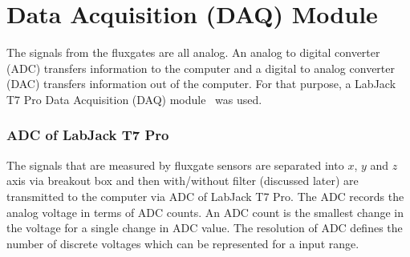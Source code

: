 \section{Data Acquisition (DAQ) Module}\label{sec:DAQ}

The signals from the fluxgates are all analog. An analog to digital converter (ADC) transfers information to the computer and a digital to analog converter (DAC) transfers information out of the computer. For that purpose, a LabJack T7 Pro Data Acquisition (DAQ) module~\cite{T7} was used.

\subsubsection{ADC of LabJack T7 Pro}

The signals that are measured by fluxgate sensors are separated into $x$, $y$ and $z$ axis via breakout box and then with/without filter (discussed later) are transmitted to the computer via ADC of LabJack T7 Pro. The ADC records the analog voltage in terms of ADC counts. An ADC count is the smallest change in the voltage for a single change in ADC value. The resolution of ADC defines the number of discrete voltages which can be represented for a input range. 



